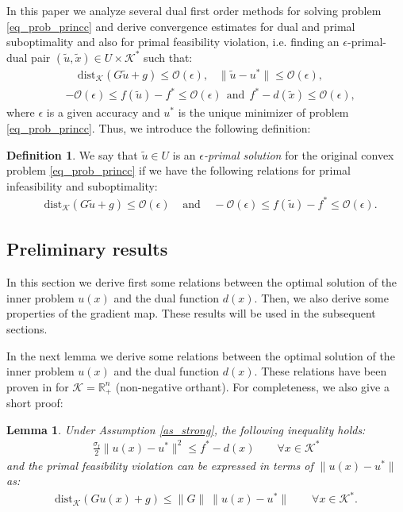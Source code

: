 \documentclass{gOMS2e}
\theoremstyle{plain}
\newtheorem{lemma}[theorem]{Lemma}
\theoremstyle{definition}
\newtheorem{definition}{Definition}
\theoremstyle{remark}
\begin{document}
\noindent  In this paper  we analyze several  dual first order
methods for solving problem  \eqref{eq_prob_princc}  and derive  convergence
estimates for  dual and primal suboptimality and also for primal feasibility
violation, i.e. finding an $\epsilon$-primal-dual pair
$\left(\tilde{u},\tilde{x}\right) \in U \times {\mathcal{K}}^*$ such that:
\begin{align}
\label{condition_outer} & ~~~~~ \text{dist}_{\mathcal{K}}(G \tilde{u} + g)
 \leq \mathcal{O} (\epsilon), \;\;\;  \| \tilde{u}- u^* \| \leq
\mathcal{O} (\epsilon), \\
&-\mathcal{O}(\epsilon)\!\leq \!f(\tilde{u}) -\! f^* \!\!\leq\!
\mathcal{O} (\epsilon) ~~\text{and} ~~f^*-d(\tilde{x}) \leq
\mathcal{O} (\epsilon), \nonumber
\end{align}
where $\epsilon$ is a given accuracy and $u^*$ is the unique minimizer of problem  \eqref{eq_prob_princc}. Thus,  we  introduce the
following definition:
\begin{definition}
We say that $\tilde u \in U$ is an \textit{$\epsilon$-primal solution} for
the original convex problem  \eqref{eq_prob_princc} if we have the
following relations for primal infeasibility and  suboptimality:
\begin{align}
\label{epsilon_primal} & \text{dist}_{\mathcal{K}}(G \tilde{u} + g)  \leq
\mathcal{O} (\epsilon) \;\;\;\; \text{and} \;\;\;\;  -\mathcal{O}(\epsilon) \leq f(\tilde{u}) - f^*
\leq  \mathcal{O} (\epsilon).
\end{align}
\end{definition}

\subsection{Preliminary results}
\noindent In this section we derive first some relations between the
optimal solution of the inner problem $u(x)$ and the dual function
$d(x)$. Then, we also derive some properties of the gradient map.
These results  will be used in the subsequent sections.

\noindent In the next lemma we derive some relations between the optimal solution of the
inner problem $u(x)$ and the dual function $d(x)$. These relations
have been proven in \cite{BecNed:14,BecTeb:14} for ${\mathcal{K}} = {\mathbb{R}}^n_+$
(non-negative orthant). For completeness, we also give a short
proof:
\begin{lemma}
\label{lemma_sc} Under Assumption \ref{as_strong}, the following
inequality holds:
\begin{align}
\label{ineq_x} \frac{\sigma_{\mathrm{f}}}{2}\| {}{u}(x) - u^*\|^2
\leq f^* - d(x) \qquad \forall x \in {\mathcal{K}}^*
\end{align}
and the primal feasibility violation  can be expressed  in terms of
$\| {}{u}(x) - u^*\|$ as:
\begin{align}
\label{ineq_feas2}
 \text{dist}_{\mathcal{K}}(G u(x) + g) \leq \|G\| \ \| {}{u}(x) - u^* \|
 \qquad \forall x \in {\mathcal{K}}^*.
\end{align}
\end{lemma}
\end{document}
